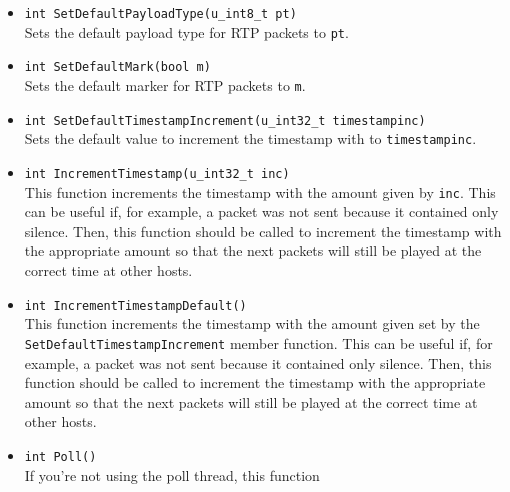 \documentclass[12pt,a4paper]{article}
\begin{document}
\begin{itemize}
{					                            u\_int8\_t pt, bool mark, u\_int32\_t timestampinc,
					                            u\_int16\_t hdrextID, const void *hdrextdata, size\_t numhdrextwords)}\\
						Sends the RTP packet with payload {\tt data} which has length {\tt len}.
						It will use payload type {\tt pt}, marker {\tt mark} and after the packet
						has been built, the timestamp will be incremented by {\tt timestampinc}.
						The packet will contain a header extension with identifier {\tt hdrextID} and
						containing data {\tt hdrextdata}. The length of this data is given by
						{\tt numhdrextwords} and is specified in a number of 32-bit words.
					\item {\tt int SetDefaultPayloadType(u\_int8\_t pt)}\\
						Sets the default payload type for RTP packets to {\tt pt}.
					\item {\tt int SetDefaultMark(bool m)}\\
						Sets the default marker for RTP packets to {\tt m}.
					\item {\tt int SetDefaultTimestampIncrement(u\_int32\_t timestampinc)}\\
						Sets the default value to increment the timestamp with to
						{\tt timestampinc}.
					\item {\tt int IncrementTimestamp(u\_int32\_t inc)}\\
						This function increments the timestamp with the amount
						given by {\tt inc}. This can be useful if, for example,
						a packet was not sent because it contained only silence.
						Then, this function should be called to increment the
						timestamp with the appropriate amount so that the next
						packets will still be played at the correct time at
						other hosts.
					\item {\tt int IncrementTimestampDefault()}\\
						This function increments the timestamp with the amount
						given set by the {\tt SetDefaultTimestampIncrement}
						member function. This can be useful if, for example,
						a packet was not sent because it contained only silence.
						Then, this function should be called to increment the
						timestamp with the appropriate amount so that the next
						packets will still be played at the correct time at
						other hosts.						
					\item {\tt int Poll()}\\
						If you're not using the poll thread, this function

\end{itemize}
\end{document}
